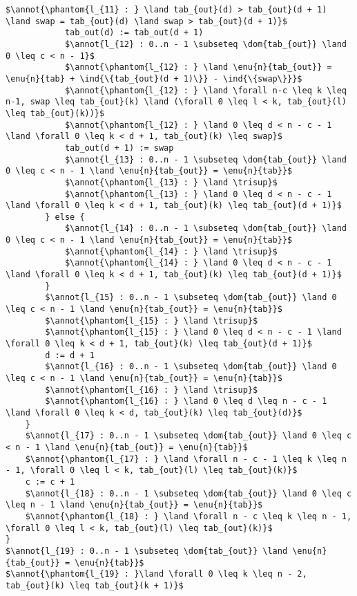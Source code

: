 \documentclass[a4paper, 11pt]{article}
\DeclareMathOperator{\eenu}{Enum}
\DeclareMathOperator{\ddom}{Dom}
\newcommand{\dom}[1]{\ddom\left(#1\right)}
\newcommand{\enu}[2]{\eenu_{\substack{#1}}\left(#2\right)}
\newcommand{\ind}[1]{\chi_{#1}}
\theoremstyle{mystyle}
\newcommand{\annot}[1]{{\color{black} #1}}
\begin{document}
\begin{lstlisting}[language=prooflang, mathescape,
    basicstyle=\ttfamily\large\color{blue!90!black},
    keywordstyle=\bfseries,
    tabsize=4]
            $\annot{\phantom{l_{11} : } \land tab_{out}(d) > tab_{out}(d + 1) \land swap = tab_{out}(d) \land swap > tab_{out}(d + 1)}$
            tab_out(d) := tab_out(d + 1)
            $\annot{l_{12} : 0..n - 1 \subseteq \dom{tab_{out}} \land 0 \leq c < n - 1}$
            $\annot{\phantom{l_{12} : } \land \enu{n}{tab_{out}} = \enu{n}{tab} + \ind{\{tab_{out}(d + 1)\}} - \ind{\{swap\}}}$
            $\annot{\phantom{l_{12} : } \land \forall n-c \leq k \leq n-1, swap \leq tab_{out}(k) \land (\forall 0 \leq l < k, tab_{out}(l) \leq tab_{out}(k))}$
            $\annot{\phantom{l_{12} : } \land 0 \leq d < n - c - 1 \land \forall 0 \leq k < d + 1, tab_{out}(k) \leq swap}$
            tab_out(d + 1) := swap
            $\annot{l_{13} : 0..n - 1 \subseteq \dom{tab_{out}} \land 0 \leq c < n - 1 \land \enu{n}{tab_{out}} = \enu{n}{tab}}$
            $\annot{\phantom{l_{13} : } \land \trisup}$
            $\annot{\phantom{l_{13} : } \land 0 \leq d < n - c - 1 \land \forall 0 \leq k < d + 1, tab_{out}(k) \leq tab_{out}(d + 1)}$
        } else {
            $\annot{l_{14} : 0..n - 1 \subseteq \dom{tab_{out}} \land 0 \leq c < n - 1 \land \enu{n}{tab_{out}} = \enu{n}{tab}}$
            $\annot{\phantom{l_{14} : } \land \trisup}$
            $\annot{\phantom{l_{14} : } \land 0 \leq d < n - c - 1 \land \forall 0 \leq k < d + 1, tab_{out}(k) \leq tab_{out}(d + 1)}$
        }
        $\annot{l_{15} : 0..n - 1 \subseteq \dom{tab_{out}} \land 0 \leq c < n - 1 \land \enu{n}{tab_{out}} = \enu{n}{tab}}$
        $\annot{\phantom{l_{15} : } \land \trisup}$
        $\annot{\phantom{l_{15} : } \land 0 \leq d < n - c - 1 \land \forall 0 \leq k < d + 1, tab_{out}(k) \leq tab_{out}(d + 1)}$
        d := d + 1
        $\annot{l_{16} : 0..n - 1 \subseteq \dom{tab_{out}} \land 0 \leq c < n - 1 \land \enu{n}{tab_{out}} = \enu{n}{tab}}$
        $\annot{\phantom{l_{16} : } \land \trisup}$
        $\annot{\phantom{l_{16} : } \land 0 \leq d \leq n - c - 1 \land \forall 0 \leq k < d, tab_{out}(k) \leq tab_{out}(d)}$
    }
    $\annot{l_{17} : 0..n - 1 \subseteq \dom{tab_{out}} \land 0 \leq c < n - 1 \land \enu{n}{tab_{out}} = \enu{n}{tab}}$
    $\annot{\phantom{l_{17} : } \land \forall n - c - 1 \leq k \leq n - 1, \forall 0 \leq l < k, tab_{out}(l) \leq tab_{out}(k)}$
    c := c + 1
    $\annot{l_{18} : 0..n - 1 \subseteq \dom{tab_{out}} \land 0 \leq c \leq n - 1 \land \enu{n}{tab_{out}} = \enu{n}{tab}}$
    $\annot{\phantom{l_{18} : } \land \forall n - c \leq k \leq n - 1, \forall 0 \leq l < k, tab_{out}(l) \leq tab_{out}(k)}$
}
$\annot{l_{19} : 0..n - 1 \subseteq \dom{tab_{out}} \land \enu{n}{tab_{out}} = \enu{n}{tab}}$
$\annot{\phantom{l_{19} : }\land \forall 0 \leq k \leq n - 2, tab_{out}(k) \leq tab_{out}(k + 1)}$
\end{lstlisting}
\end{document}
